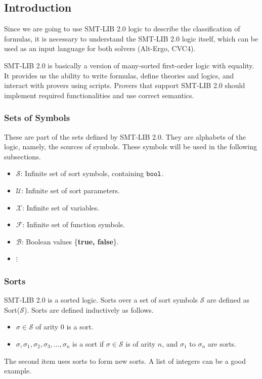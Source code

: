 \documentclass[10pt,letter]{article}
\theoremstyle{definition}
\begin{document}
\subsection{Introduction}

Since we are going to use SMT-LIB 2.0 logic to describe the classification of formulas, it is necessary to understand the SMT-LIB 2.0 logic itself, which can be used as an input language for both solvers (Alt-Ergo, CVC4).

SMT-LIB 2.0 is basically a version of many-sorted first-order logic with equality\cite{bs2010}. It provides us the ability to write formulas, define theories and logics, and interact with provers using scripts. Provers that support SMT-LIB 2.0 should implement required functionalities and use correct semantics.

\subsubsection{Sets of Symbols}

These are part of the sets defined by SMT-LIB 2.0\cite{barrett:smt-lib:2010}. They are alphabets of the logic, namely, the sources of symbols. These symbols will be used in the following subsections.
\begin{itemize}
\item $\mathcal{S}$: Infinite set of sort symbols, containing $\tt bool$.
\item $\mathcal{U}$: Infinite set of sort parameters.
\item $\mathcal{X}$: Infinite set of variables.
\item $\mathcal{F}$: Infinite set of function symbols.
\item $\mathcal{B}$: Boolean values \{{\bf true, false}\}.
\item \qquad$\vdots$
\end{itemize}



\subsubsection{Sorts}

SMT-LIB 2.0 is a sorted logic. Sorts over a set of sort symbols $\mathcal{S}$ are defined as Sort($\mathcal{S}$). Sorts are defined inductively as follows.

\begin{itemize}
\item $\sigma \in \mathcal{S}$ of arity 0 is a sort.
\item $\sigma,\sigma_1, \sigma_2, \sigma_3, \ldots, \sigma_n$ is a sort if $\sigma \in \mathcal{S}$ is of arity $n$, and $\sigma_1$ to $\sigma_n$ are sorts.
\end{itemize}
The second item uses sorts to form new sorts. A list of integers can be a good example.
\end{document}
